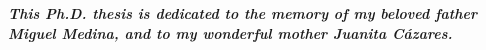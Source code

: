 \chapter*{}
\textit{\textbf{This Ph.D. thesis is dedicated to the memory of my beloved father 
Miguel Medina, and to my wonderful mother Juanita C\'azares.}}